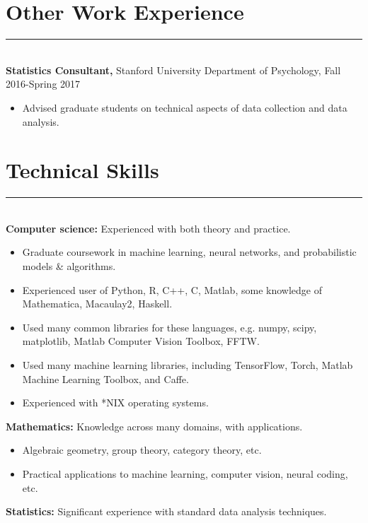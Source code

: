 \documentclass[margin]{res}
\begin{document}
\begin{resume}
\vspace{1pt}\section{Other Work Experience} \vspace{-15pt} \rule{\textwidth}{0.5pt} \\[3pt]
{\bf Statistics Consultant,} Stanford University Department of Psychology, Fall 2016-Spring 2017
\begin{itemize} \itemsep -2pt
 \item Advised graduate students on technical aspects of data collection and data analysis. \end{itemize}
\vspace{1pt}\section{Technical Skills} \vspace{-15pt} \rule{\textwidth}{0.5pt} \\[3pt]
{\bf Computer science:} Experienced with both theory and practice. 
\begin{itemize} \itemsep -2pt
  \item Graduate coursework in machine learning, neural networks, and probabilistic models \& algorithms.
  \item Experienced user of Python, R, C++, C, Matlab, some knowledge of Mathematica, Macaulay2, Haskell. 
  \item Used many common libraries for these languages, e.g. numpy, scipy, matplotlib, Matlab Computer Vision Toolbox, FFTW.
  \item Used many machine learning libraries, including TensorFlow, Torch, Matlab Machine Learning Toolbox, and Caffe.
  \item Experienced with *NIX operating systems.
\end{itemize}\vspace{-8pt}
{\bf Mathematics:} Knowledge across many domains, with applications.
\begin{itemize} \itemsep -2pt
\item Algebraic geometry, group theory, category theory, etc. \item Practical applications to machine learning, computer vision, neural coding, etc. \end{itemize}\vspace{-8pt}
{\bf Statistics:} Significant experience with standard data analysis techniques.
\begin{itemize} \itemsep -2pt

\end{itemize}
\end{resume}
\end{document}
